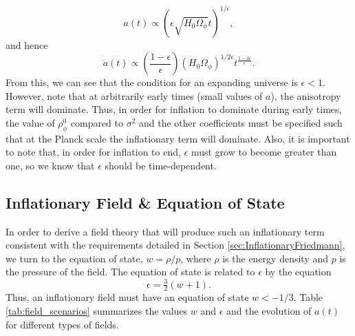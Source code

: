 \documentclass[a4paper,11pt]{article}
\newcommand{\mep}[1]{{\color{applegreen} \textbf{[MEP:  #1]}}}
\begin{document}
\begin{equation}
a(t) \propto (\epsilon \sqrt{H_0 \Omega_\phi} t)^{1/\epsilon},
\label{eqn:inflation_a(t)}
\end{equation}
and hence 
\begin{equation}
\ddot a(t) \propto \left ( \frac{1-\epsilon}{\epsilon} \right ) (H_0 \Omega_\phi)^{1/2\epsilon} t^{\tfrac{1-2\epsilon}{\epsilon}}. 
\end{equation}
From this, we can see that the condition for an expanding universe is $\epsilon<1$. 
However, note that at arbitrarily early times (small values of $a$), the anisotropy term will dominate. Thus, in order for inflation to dominate during early times, the value of $\rho^0_\phi$ compared to $\sigma^2$ and the other coefficients must be specified such that at the Planck scale the inflationary term will dominate. %
Also, it is important to note that, in order for inflation to end, $\epsilon$ must grow to become greater than one, so we know that $\epsilon$ should be time-dependent. 

\subsection{Inflationary Field \& Equation of State}

In order to derive a field theory that will produce such an inflationary term consistent with the requirements detailed in Section \ref{sec:InflationaryFriedmann}, we turn to the equation of state, $w=\rho/p$, where $\rho$ is the energy density and $p$ is the pressure of the field. The equation of state is related to $\epsilon$ by the equation 
\begin{equation}
\epsilon = \tfrac{3}{2}(w+1). 
\label{eqn:eps_w}
\end{equation}
Thus, an inflationary field must have an equation of state $w<-1/3$. Table \ref{tab:field_scenarios} summarizes the values $w$ and $\epsilon$ and the evolution of $a(t)$ for different types of fields. 
\end{document}
